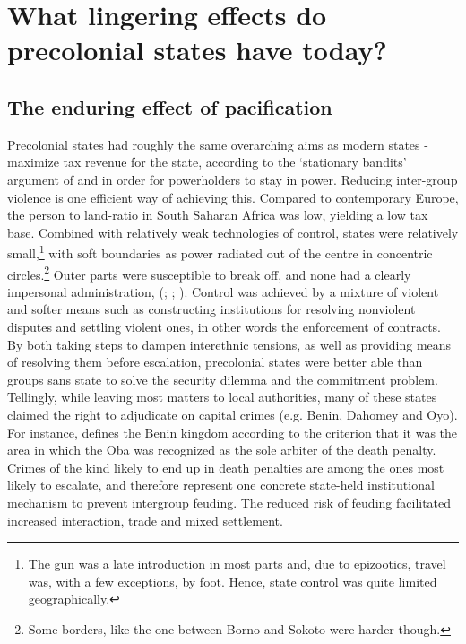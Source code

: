 



 
\section{What lingering effects do precolonial states have today?}
\label{What lingering effects do precolonial states have today?}

\subsection{The enduring effect of pacification} 
\label{The enduring effect of pacification}

Precolonial states had roughly the same overarching aims as modern states -
maximize tax revenue for the state, according to the `stationary bandits'
argument of \citet{tilly_1985} and \citet{Olson1993} in order for powerholders
to stay in power. Reducing inter-group violence is one efficient way of
achieving this. Compared to contemporary Europe, the person to land-ratio in
South Saharan Africa was low, yielding a low tax base. Combined with relatively
weak technologies of control, states were relatively small,\footnote{The gun was
a late introduction in most parts and, due to epizootics, travel was, with a few
exceptions, by foot. Hence, state control was quite limited geographically.}
with soft boundaries as power radiated out of the centre in concentric
circles.\footnote{Some borders, like the one between Borno and Sokoto were
harder though.} Outer parts were susceptible to break off, and none had a
clearly impersonal administration, (\citealp[20]{englebert2013inside};
\citealp{Herbst2014}; \citealp[135]{tibebu1995making}). Control was achieved by
a mixture of violent and softer means such as constructing institutions for
resolving nonviolent disputes and settling violent ones, in other words the
enforcement of contracts. By both taking steps to dampen interethnic tensions,
as well as providing means of resolving them before escalation, precolonial
states were better able than groups sans state to solve the security dilemma and
the commitment problem. Tellingly, while leaving most matters to local
authorities, many of these states claimed the right to adjudicate on capital
crimes (e.g. Benin, Dahomey and Oyo). For instance,
\citet[3-4]{BradburyR.E1970TBka} defines the Benin kingdom according to the
criterion that it was the area in which the Oba was recognized as the sole
arbiter of the death penalty. Crimes of the kind likely to end up in death
penalties are among the ones most likely to escalate, and therefore represent
one concrete state-held institutional mechanism to prevent intergroup feuding.
The reduced risk of feuding facilitated increased interaction, trade and mixed
settlement.

